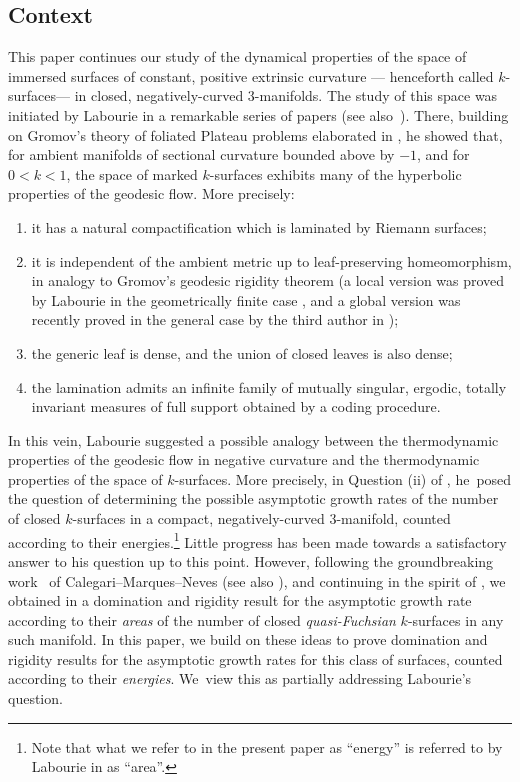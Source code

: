 \documentclass[10pt]{amsart}
\newcommand{\ksurfaces}{$k$\nobreakdash-surfaces\xspace}
\theoremstyle{plain}
\theoremstyle{definition}
\begin{document}
\subsection{Context}
This paper continues our study of the dynamical properties of the space of immersed surfaces of constant, positive extrinsic curvature --- henceforth called \ksurfaces --- in closed, negatively-curved $3$\nobreakdash-manifolds. The study of this space was initiated by Labourie in a remarkable series of papers \cite{LabourieGAFA,LabourieInvent,LabourieAnnals} (see also~\cite{Labourie_phase_space}). There, building on Gromov's theory of foliated Plateau problems elaborated in \hbox{\cite{Gromov_FolPlateau1,Gromov_FolPlateau2}}, he showed that, for ambient manifolds of sectional curvature bounded above by $-1$, and for $0<k<1$, the space of marked \ksurfaces exhibits many of the hyperbolic properties of the geodesic flow. More precisely:
\begin{enumerate}
\item it has a natural compactification which is laminated by Riemann surfaces;
\item it is independent of the ambient metric up to leaf-preserving homeomorphism, in analogy to Gromov's geodesic rigidity theorem \cite{Gromov3} (a local version was proved by Labourie in the geometrically finite case \cite{LabourieInvent}, and a global version was recently proved in the general case by the third author in \cite{Smith_asymp});
\item the generic leaf is dense, and the union of closed leaves is also dense;
\item the lamination admits an infinite family of mutually singular, ergodic, totally invariant measures of full support obtained by a coding procedure.
\end{enumerate}

In this vein, Labourie suggested a possible analogy between the thermodynamic properties of the geodesic flow in negative curvature and the thermodynamic properties of the space of \ksurfaces \cite{LabourieInvent,Labourie_phase_space}. More precisely, in Question (ii) of \cite[\S1.2]{LabourieInvent}, he~posed the question of determining the possible asymptotic growth rates of the number of closed \ksurfaces in a compact, negatively-curved $3$\nobreakdash-manifold, counted according to their energies.\footnote{Note that what we refer to in the present paper as ``energy'' is referred to by Labourie in \cite{LabourieInvent} as ``area''.} Little progress has been made towards a satisfactory answer to his question up to this point. However, following the groundbreaking work~\cite{CMN} of Calegari--Marques--Neves (see also \cite{LabourieBourbaki}), and continuing in the spirit of \cite{BCG}, we obtained in \cite{ALS} a domination and rigidity result for the asymptotic growth rate according to their \emph{areas} of the number of closed \emph{quasi-Fuchsian} \ksurfaces in any such manifold. In this paper, we build on these ideas to prove domination and rigidity results for the asymptotic growth rates for this class of surfaces, counted according to their \textit{energies}. We~view this as partially addressing Labourie's question.
\end{document}
